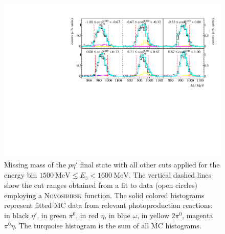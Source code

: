   \begin{figure}[htbp]
 	\centering
 	\includegraphics[width=\linewidth]{../figs/hydrogen/bin_cuts/mismcut_ebin1.pdf}
 	\caption{Missing mass of the $p\eta'$ final state with all other cuts applied for the energy bin $\SI{1500}{\mega\eV}\leq E_\gamma<\SI{1600}{\mega\eV}$. The vertical dashed lines show the cut ranges obtained from a fit to data (open circles) employing a \textsc{Novosibirsk} function. The solid colored histograms represent fitted MC data from relevant  photoproduction reactions: in black $\eta'$, in green $\pi^0$, in red $\eta$, in blue $\omega$, in yellow $2\pi^0$, magenta $\pi^0\eta$. The turquoise histogram is the sum of all MC histograms.}
 	\label{fig:mism}
 \end{figure}
